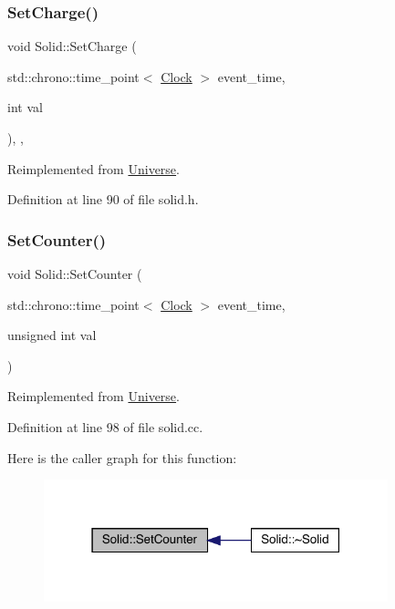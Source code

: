 \subsubsection{\texorpdfstring{Set\+Charge()}{SetCharge()}}
{\footnotesize\ttfamily void Solid\+::\+Set\+Charge (\begin{DoxyParamCaption}\item[{std\+::chrono\+::time\+\_\+point$<$ \hyperlink{universe_8h_a0ef8d951d1ca5ab3cfaf7ab4c7a6fd80}{Clock} $>$}]{event\+\_\+time,  }\item[{int}]{val }\end{DoxyParamCaption})\hspace{0.3cm}{\ttfamily [inline]}, {\ttfamily [final]}, {\ttfamily [virtual]}}



Reimplemented from \hyperlink{class_universe_a3b3da7c86a7b75e5e5c0b7972ac82a87}{Universe}.



Definition at line 90 of file solid.\+h.

\mbox{\label{class_solid_aea949040518e505ed39b1456a360c5e0}} 
\subsubsection{\texorpdfstring{Set\+Counter()}{SetCounter()}}
{\footnotesize\ttfamily void Solid\+::\+Set\+Counter (\begin{DoxyParamCaption}\item[{std\+::chrono\+::time\+\_\+point$<$ \hyperlink{universe_8h_a0ef8d951d1ca5ab3cfaf7ab4c7a6fd80}{Clock} $>$}]{event\+\_\+time,  }\item[{unsigned int}]{val }\end{DoxyParamCaption})\hspace{0.3cm}{\ttfamily [virtual]}}



Reimplemented from \hyperlink{class_universe_aa22202ae740eb1355529afcb13285e91}{Universe}.



Definition at line 98 of file solid.\+cc.

Here is the caller graph for this function\+:
\nopagebreak
\begin{figure}[H]
\begin{center}
\leavevmode
\includegraphics[width=283pt]{class_solid_aea949040518e505ed39b1456a360c5e0_icgraph}
\end{center}
\end{figure}
\mbox{\label{class_solid_a9a660f9d94f597712c67922aa1d4d795}} 
